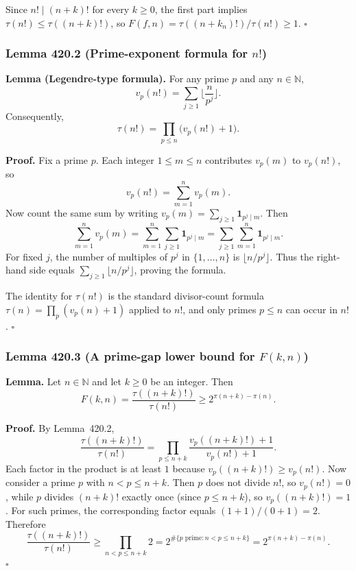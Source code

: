 Since $n!\mid (n+k)!$ for every $k\ge 0$, the first part implies $\tau(n!)\le \tau((n+k)!)$, so $F(f,n)=\tau((n+k_n)!)/\tau(n!)\ge 1$.
\hfill$\square$

\subsubsection*{Lemma 420.2 (Prime-exponent formula for $n!$)}
\textbf{Lemma (Legendre-type formula).} For any prime $p$ and any $n\in\mathbb{N}$,
\[
v_p(n!)=\sum_{j\ge 1} \Big\lfloor\frac{n}{p^j}\Big\rfloor.
\]
Consequently,
\[
\tau(n!)=\prod_{p\le n}\big(v_p(n!)+1\big).
\]

\textbf{Proof.}
Fix a prime $p$. Each integer $1\le m\le n$ contributes $v_p(m)$ to $v_p(n!)$, so
\[
v_p(n!)=\sum_{m=1}^n v_p(m).
\]
Now count the same sum by writing $v_p(m)=\sum_{j\ge 1} \mathbf{1}_{p^j\mid m}$.
Then
\[
\sum_{m=1}^n v_p(m)=\sum_{m=1}^n \sum_{j\ge 1} \mathbf{1}_{p^j\mid m}
=\sum_{j\ge 1} \sum_{m=1}^n \mathbf{1}_{p^j\mid m}.
\]
For fixed $j$, the number of multiples of $p^j$ in $\{1,\dots,n\}$ is $\lfloor n/p^j\rfloor$.
Thus the right-hand side equals $\sum_{j\ge 1}\lfloor n/p^j\rfloor$, proving the formula.

The identity for $\tau(n!)$ is the standard divisor-count formula $\tau(n)=\prod_p (v_p(n)+1)$ applied to $n!$, and only primes $p\le n$ can occur in $n!$.
\hfill$\square$

\subsubsection*{Lemma 420.3 (A prime-gap lower bound for $F(k,n)$)}
\textbf{Lemma.} Let $n\in\mathbb{N}$ and let $k\ge 0$ be an integer. Then
\[
F(k,n)=\frac{\tau((n+k)!)}{\tau(n!)}\ge 2^{\pi(n+k)-\pi(n)}.
\]

\textbf{Proof.}
By Lemma~420.2,
\[
\frac{\tau((n+k)!)}{\tau(n!)}=\prod_{p\le n+k} \frac{v_p((n+k)!)+1}{v_p(n!)+1}.
\]
Each factor in the product is at least $1$ because $v_p((n+k)!)\ge v_p(n!)$.
Now consider a prime $p$ with $n<p\le n+k$.
Then $p$ does not divide $n!$, so $v_p(n!)=0$, while $p$ divides $(n+k)!$ exactly once (since $p\le n+k$), so $v_p((n+k)!)=1$.
For such primes, the corresponding factor equals $(1+1)/(0+1)=2$.
Therefore
\[
\frac{\tau((n+k)!)}{\tau(n!)}\ge \prod_{n<p\le n+k} 2 = 2^{\#\{p\text{ prime}: n<p\le n+k\}}=2^{\pi(n+k)-\pi(n)}.
\]
\hfill$\square$

